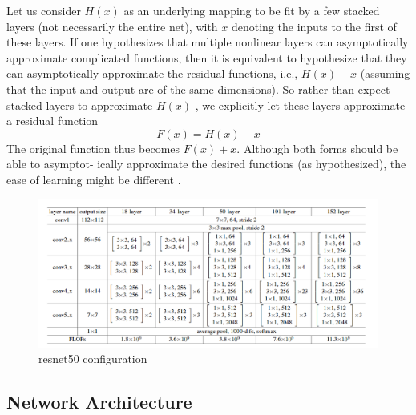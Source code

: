 \documentclass[10pt]{report}
\begin{document}
	Let us consider $H(x)$ as an underlying mapping to be fit by a few stacked
	layers (not necessarily the entire net), with $x$ denoting the inputs to the
	first of these layers. If one hypothesizes that multiple nonlinear layers
	can asymptotically approximate complicated functions, then it is equivalent
	to hypothesize that they can asymptotically approximate the residual
	functions, i.e., $H(x) - x$ (assuming that the input and output are of the
	same dimensions). So rather than expect stacked layers to approximate $H(x)$
	, we explicitly let these layers approximate a residual function
	\begin{equation}
		F(x) = H(x) - x
	\end{equation}
	The original function thus becomes $F(x) + x$. Although both forms should be
	able to asymptot- ically approximate the desired functions (as
	hypothesized), the ease of learning might be different \cite[3]{he2015deep}.

	\begin{figure}[h]
		\centering
		\includegraphics[width=\linewidth]{imgs/resnet_arch.png}
		\caption{resnet50 configuration}%
		\label{fig:resnet conf}
	\end{figure}


	\subsection{Network Architecture}
\end{document}
